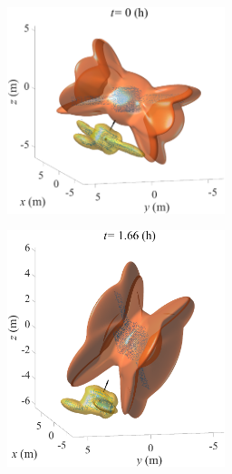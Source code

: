 \documentclass[lang=chs, degree=master, blindreview=false, winfonts=true]{yanputhesis}
\begin{document}
\begin{figure}[htb!]
	\centering
	\begin{minipage}[t]{0.96\textwidth}
		\centering
		\begin{subfigure}[t]{0.47\textwidth}
			\centering
			\includegraphics[width = 2.5in]{picture/detumble_time1.eps}
			\caption{ }
			\label{fig:detumbletime1}
		\end{subfigure}\hfill
		\begin{subfigure}[t]{0.47\textwidth}
			\centering
			\includegraphics[width = 2.5in]{picture/detumble_time2.eps}
			\caption{ }
			\label{fig:detumbletime2}
		\end{subfigure}
		

\end{minipage}
\end{figure}
\end{document}
